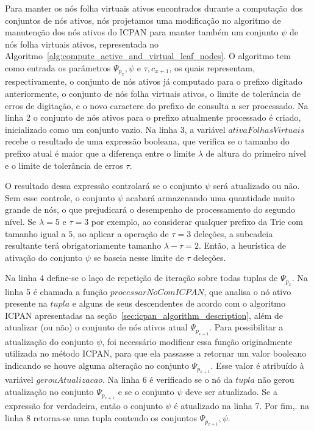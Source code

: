 Para manter os nós folha virtuais ativos encontrados durante a computação dos conjuntos de nós ativos, nós projetamos uma modificação no algoritmo de manutenção dos nós ativos do ICPAN para manter também um conjunto $\psi$ de nós folha virtuais ativos, representada no Algoritmo~\ref{alg:compute_active_and_virtual_leaf_nodes}. O algoritmo tem como entrada os parâmetros $\Psi_{p_x}, \psi$ e $\tau, c_{x+1}$, os quais representam, respectivamente, o conjunto de nós ativos já computado para o prefixo digitado anteriormente, o conjunto de nós folha virtuais ativos, o limite de tolerância de erros de digitação, e o novo caractere do prefixo de consulta a ser processado. Na linha 2 o conjunto de nós ativos para o prefixo atualmente processado é criado, inicializado como um conjunto vazio. Na linha 3, a variável $ativaFolhasVirtuais$ recebe o resultado de uma expressão booleana, que verifica se o tamanho do prefixo atual é maior que a diferença entre o limite $\lambda$ de altura do primeiro nível e o limite de tolerância de erros $\tau$. 

O resultado dessa expressão controlará se o conjunto $\psi$ será atualizado ou não. Sem esse controle, o conjunto $\psi$ acabará armazenando uma quantidade muito grande de nós, o que prejudicará o desempenho de processamento do segundo nível. Se $\lambda = 5$ e $\tau = 3$ por exemplo, ao considerar qualquer prefixo da Trie com tamanho igual a $5$, ao aplicar a operação de $\tau = 3$ deleções, a subcadeia resultante terá obrigatoriamente tamanho $\lambda - \tau = 2$. Então, a heurística de ativação do conjunto $\psi$ se baseia nesse limite de $\tau$ deleções. 

Na linha 4 define-se o laço de repetição de iteração sobre todas tuplas de $\Psi_{p_x}$. Na linha 5 é chamada a função $processarNoComICPAN$, que analisa o nó ativo presente na $tupla$ e alguns de seus descendentes de acordo com o algoritmo ICPAN apresentadas na seção~\ref{sec:icpan_algorithm_description}, além de atualizar (ou não) o conjunto de nós ativos atual $\Psi_{p_{x+1}}$. Para possibilitar a atualização do conjunto $\psi$, foi necessário modificar essa função originalmente utilizada no método ICPAN, para que ela passasse a retornar um valor booleano indicando se houve alguma alteração no conjunto $\Psi_{p_{x+1}}$. Esse valor é atribuído à variável $gerouAtualizacao$. Na linha 6 é verificado se o nó da $tupla$ não gerou atualização no conjunto $\Psi_{p_{x+1}}$ e se o conjunto $\psi$ deve ser atualizado. Se a expressão for verdadeira, então o conjunto $\psi$ é atualizado na linha 7. Por fim,. na linha 8 retorna-se uma tupla contendo os conjuntos $\Psi_{p_{x+1}}, \psi$.

